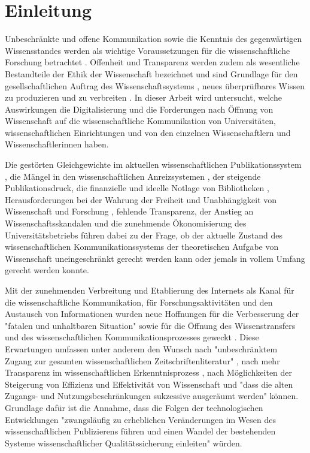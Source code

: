 \chapter{Einleitung}

Unbeschränkte und offene Kommunikation sowie die Kenntnis des gegenwärtigen Wissensstandes werden als wichtige Voraussetzungen für die wissenschaftliche Forschung betrachtet \cite{Glaeser_2006} \cite{Gibbons_1994}. Offenheit und Transparenz werden zudem als wesentliche Bestandteile der Ethik der Wissenschaft bezeichnet \cite{Peters_2014} \cite{Resnik_2005} und sind Grundlage für den gesellschaftlichen Auftrag des Wissenschaftssystems \cite[:3]{Hanekop_2014}, neues überprüfbares Wissen zu produzieren und zu verbreiten \cite[:551]{Luescher_2014} \cite[:298]{Luhmann_1998} \cite[:100]{Graefen_2007}. In dieser Arbeit wird untersucht, welche Auswirkungen die Digitalisierung und die Forderungen nach Öffnung von Wissenschaft auf die wissenschaftliche Kommunikation von Universitäten, wissenschaftlichen Einrichtungen und von den einzelnen Wissenschaftlern und Wissenschaftlerinnen haben.

Die gestörten Gleichgewichte im aktuellen wissenschaftlichen Publikationssystem \cite{Jospeph_2006}, die Mängel in den wissenschaftlichen Anreizsystemen \cite{Osterloh_2008}, der steigende Publikationsdruck, die finanzielle und ideelle Notlage von Bibliotheken \cite{Russell_2008} \cite{Sietmann_2007}, Herausforderungen bei der Wahrung der Freiheit und Unabhängigkeit von Wissenschaft und Forschung \cite{Goetting_2015}, fehlende Transparenz, der Anstieg an Wissenschaftsskandalen \cite{Brembs_2015} und die zunehmende Ökonomisierung des Universitätsbetriebs \cite{Bauer_2006} führen dabei zu der Frage, ob der aktuelle Zustand des wissenschaftlichen Kommunikationssystems der theoretischen Aufgabe von Wissenschaft uneingeschränkt gerecht werden kann \cite{Schekman_2013} oder jemals in vollem Umfang gerecht werden konnte.

Mit der zunehmenden Verbreitung und Etablierung des Internets als Kanal für die wissenschaftliche Kommunikation, für Forschungsaktivitäten und den Austausch von Informationen wurden neue Hoffnungen für die Verbesserung der "fatalen und unhaltbaren Situation" \cite[:155]{Brembs_2015} sowie für die Öffnung des Wissenstransfers \cite{Schulze_2013} \cite{Albert_2006} und des wissenschaftlichen Kommunikationsprozesses geweckt \cite{Hanekop_2014} \cite{European_Commission_2006} \cite{Goodrum_2001} \cite{Lawrence_1999}. Diese Erwartungen umfassen unter anderem den Wunsch nach "unbeschränktem Zugang zur gesamten wissenschaftlichen Zeitschriftenliteratur" \cite{BOAI_2002}, nach mehr Transparenz im wissenschaftlichen Erkenntnisprozess \cite{European_Commission_2015a}, nach Möglichkeiten der Steigerung von Effizienz und Effektivität von Wissenschaft \cite{Partha_1994} und "dass die alten Zugangs- und Nutzungsbeschränkungen sukzessive ausgeräumt werden" \cite{BOAI_2002} können. Grundlage dafür ist die Annahme, dass die Folgen der technologischen Entwicklungen "zwangsläufig zu erheblichen Veränderungen im Wesen des wissenschaftlichen Publizierens führen und einen Wandel der bestehenden Systeme wissenschaftlicher Qualitätssicherung einleiten" \cite{Berliner_Erklaerung_2003} würden.


